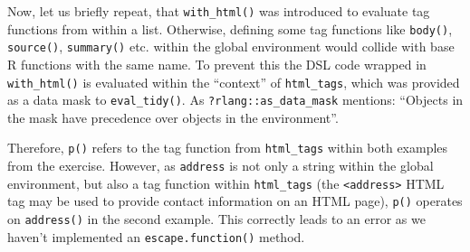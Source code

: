 \documentclass[
]{krantz}
\makeatletter
\newenvironment{Shaded}{\begin{snugshade}}{\end{snugshade}}
\newcommand{\ControlFlowTok}[1]{\textcolor[rgb]{0.13,0.29,0.53}{\textbf{#1}}}
\newcommand{\KeywordTok}[1]{\textcolor[rgb]{0.13,0.29,0.53}{\textbf{#1}}}
\newcommand{\NormalTok}[1]{#1}
\newcommand{\OperatorTok}[1]{\textcolor[rgb]{0.81,0.36,0.00}{\textbf{#1}}}
\newcommand{\StringTok}[1]{\textcolor[rgb]{0.31,0.60,0.02}{#1}}
\newenvironment{kframe}{%
\medskip{}
\setlength{\fboxsep}{.8em}
 \def\at@end@of@kframe{}%
 \ifinner\ifhmode%
  \def\at@end@of@kframe{\end{minipage}}%
  \begin{minipage}{\columnwidth}%
 \fi\fi%
 \def\FrameCommand##1{\hskip\@totalleftmargin \hskip-\fboxsep
 \colorbox{shadecolor}{##1}\hskip-\fboxsep
     \hskip-\linewidth \hskip-\@totalleftmargin \hskip\columnwidth}%
 \MakeFramed {\advance\hsize-\width
   \@totalleftmargin\z@ \linewidth\hsize
   \@setminipage}}%
 {\par\unskip\endMakeFramed%
 \at@end@of@kframe}
\renewenvironment{Shaded}{\begin{kframe}}{\end{kframe}}
\renewcommand{\KeywordTok} [1]{\textcolor[rgb]{0.00,0.44,0.13}{{#1}}}
\renewcommand{\StringTok}  [1]{\textcolor[rgb]{0.25,0.44,0.63}{{#1}}}
\renewcommand{\NormalTok}  [1]{{#1}}
\makeatother
\begin{document}
\begin{Shaded}
\end{Shaded}

Now, let us briefly repeat, that \texttt{with\_html()} was introduced to evaluate tag functions from within a list. Otherwise, defining some tag functions like \texttt{body()}, \texttt{source()}, \texttt{summary()} etc. within the global environment would collide with base R functions with the same name. To prevent this the DSL code wrapped in \texttt{with\_html()} is evaluated within the ``context'' of \texttt{html\_tags}, which was provided as a data mask to \texttt{eval\_tidy()}. As \texttt{?rlang::as\_data\_mask} mentions: ``Objects in the mask have precedence over objects in the environment''.

Therefore, \texttt{p()} refers to the tag function from \texttt{html\_tags} within both examples from the exercise. However, as \texttt{address} is not only a string within the global environment, but also a tag function within \texttt{html\_tags} (the \texttt{\textless{}address\textgreater{}} HTML tag may be used to provide contact information on an HTML page), \texttt{p()} operates on \texttt{address()} in the second example. This correctly leads to an error as we haven't implemented an \texttt{escape.function()} method.
\end{document}
